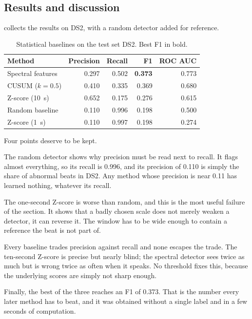 \documentclass[a4paper, 12pt]{article}
\begin{document}
\subsection{Results and discussion} \label{subsec:statresults}

 collects the results on DS2, with a random detector added
for reference.

\begin{table}[htbp]
  \centering
  \small
  \caption{Statistical baselines on the test set DS2. Best F1 in bold.}
  \label{tab:statbaselines}
  \begin{tabular}{@{}lrrrr@{}}
    \toprule
    \textbf{Method} & \textbf{Precision} & \textbf{Recall} & \textbf{F1}
      & \textbf{ROC AUC} \\
    \midrule
    Spectral features    & 0.297 & 0.502 & \textbf{0.373} & 0.773 \\
    CUSUM ($k=0.5$)      & 0.410 & 0.335 & 0.369 & 0.680 \\
    Z-score (\SI{10}{\second}) & 0.652 & 0.175 & 0.276 & 0.615 \\
    Random baseline      & 0.110 & 0.996 & 0.198 & 0.500 \\
    Z-score (\SI{1}{\second})  & 0.110 & 0.997 & 0.198 & 0.274 \\
    \bottomrule
  \end{tabular}
\end{table}

Four points deserve to be kept.

The random detector shows why precision must be read next to recall. It flags
almost everything, so its recall is \num{0.996}, and its precision of \num{0.110}
is simply the share of abnormal beats in DS2. Any method whose precision is near
\num{0.11} has learned nothing, whatever its recall.

The one-second Z-score is worse than random, and this is the most useful failure
of the section. It shows that a badly chosen scale does not merely weaken a
detector, it can reverse it. The window has to be wide enough to contain a
reference the beat is not part of.

Every baseline trades precision against recall and none escapes the trade. The
ten-second Z-score is precise but nearly blind; the spectral detector sees twice
as much but is wrong twice as often when it speaks. No threshold fixes this,
because the underlying scores are simply not sharp enough.

Finally, the best of the three reaches an F1 of \num{0.373}. That is the number
every later method has to beat, and it was obtained without a single label and in
a few seconds of computation.
\end{document}
